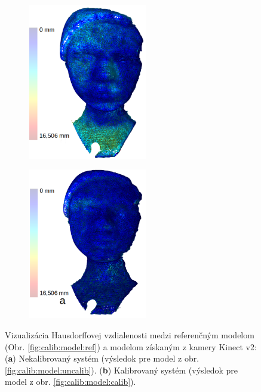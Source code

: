 \begin{figure}[h]
	\centering
	\begin{subfigure}[b]{0.49\textwidth}
		\centering
		\includegraphics[width=0.57\textwidth]{figures/calibration_hausdorff_single_uncalib.png}
		\caption{}
		\label{fig:calib:haus:single:uncalib}
	\end{subfigure}
	\begin{subfigure}[b]{0.49\textwidth}
		\centering
		\includegraphics[width=0.57\textwidth]{figures/calibration_hausdorff_single_calib.png}
		\caption{}
		\label{fig:calib:haus:single:calib}
	\end{subfigure}
	\caption{Vizualizácia Hausdorffovej vzdialenosti medzi referenčným modelom (Obr. \ref{fig:calib:model:ref}) a modelom získaným z kamery Kinect v2: (\textbf{a}) Nekalibrovaný systém (výsledok pre model z obr. \ref{fig:calib:model:uncalib}). (\textbf{b}) Kalibrovaný systém (výsledok pre model z obr. \ref{fig:calib:model:calib}).}
	\label{fig:calib:haus:single}
\end{figure}

